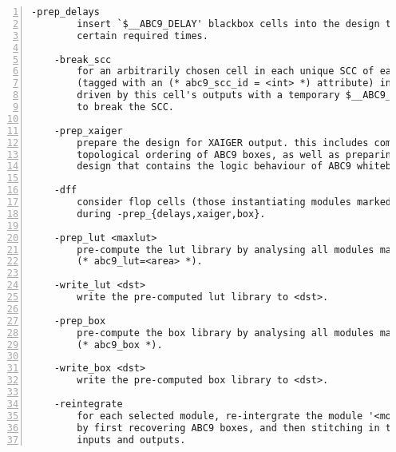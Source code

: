 \begin{lstlisting}[numbers=left,frame=single]
    -prep_delays
        insert `$__ABC9_DELAY' blackbox cells into the design to account for
        certain required times.

    -break_scc
        for an arbitrarily chosen cell in each unique SCC of each selected module
        (tagged with an (* abc9_scc_id = <int> *) attribute) interrupt all wires
        driven by this cell's outputs with a temporary $__ABC9_SCC_BREAKER cell
        to break the SCC.

    -prep_xaiger
        prepare the design for XAIGER output. this includes computing the
        topological ordering of ABC9 boxes, as well as preparing the '$abc9_holes'
        design that contains the logic behaviour of ABC9 whiteboxes.

    -dff
        consider flop cells (those instantiating modules marked with (* abc9_flop *))
        during -prep_{delays,xaiger,box}.

    -prep_lut <maxlut>
        pre-compute the lut library by analysing all modules marked with
        (* abc9_lut=<area> *).

    -write_lut <dst>
        write the pre-computed lut library to <dst>.

    -prep_box
        pre-compute the box library by analysing all modules marked with
        (* abc9_box *).

    -write_box <dst>
        write the pre-computed box library to <dst>.

    -reintegrate
        for each selected module, re-intergrate the module '<module-name>$abc9'
        by first recovering ABC9 boxes, and then stitching in the remaining primary
        inputs and outputs.
\end{lstlisting}

